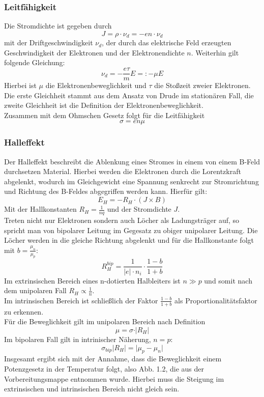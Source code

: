 \subsubsection{Leitfähigkeit}
Die Stromdichte ist gegeben durch 
$$J = \rho \cdot \nu _d = - e n \cdot \nu _d$$
mit der Driftgeschwindigkeit $\nu _d$, der durch das elektrische Feld erzeugten Geschwindigkeit der Elektronen und der Elektronendichte $n$. Weiterhin gilt folgende Gleichung:
$$\nu _d = - \frac{e \tau}{m} E =: -\mu E $$
Hierbei ist $\mu$ die Elektronenbeweglichkeit und $\tau$ die Stoßzeit zweier Elektronen. Die erste Gleichheit stammt aus dem Ansatz von Drude im stationären Fall, die zweite Gleichheit ist die Definition der Elektronenbeweglichkeit. \\
Zusammen mit dem Ohmschen Gesetz folgt für die Leitfähigkeit
$$\sigma = en\mu $$
\subsubsection{Halleffekt}
Der Halleffekt beschreibt die Ablenkung eines Stromes in einem von einem B-Feld durchsetzen Material. Hierbei werden die Elektronen durch die Lorentzkraft abgelenkt, wodurch im Gleichgewicht eine Spannung senkrecht zur Stromrichtung und Richtung des B-Feldes abgegriffen werden kann. Hierfür gilt:
$$E_H = -R_H \cdot (J \times B) $$
Mit der Hallkonstanten $R_H = \frac{1}{nq}$ und der Stromdichte $J$.\\
Treten nicht nur Elektronen sondern auch Löcher als Ladungsträger auf, so spricht man von bipolarer Leitung im Gegesatz zu obiger unipolarer Leitung. Die Löcher werden in die gleiche Richtung abgelenkt und für die Hallkonstante folgt mit $b = \frac{\mu _n}{\mu _p}$:
$$R_H^{bip} = \frac{1}{\vert e \vert \cdot n_i} \cdot \frac{1 - b}{1 + b}$$
Im extrinsischen Bereich eines n-dotierten Halbleiters ist $n \gg p$ und somit nach dem unipolaren Fall $R_H \propto \frac{1}{n}$. \\
Im intrinsischen Bereich ist schließlich der Faktor $\frac{1 - b}{1 + b}$ als Proportionalitätsfaktor zu erkennen.\\
\newline
Für die Beweglichkeit gilt im unipolaren Bereich nach Definition
$$\mu = \sigma \cdot \vert R_H \vert $$
Im bipolaren Fall gilt in intrinischer Näherung, $n = p$:
$$\sigma _{bip} \vert R_H \vert = \vert \mu_p - \mu_n \vert$$
Insgesamt ergibt sich mit der Annahme, dass die Beweglichkeit einem Potenzgesetz in der Temperatur folgt, also Abb. 1.2, die aus der Vorbereitungsmappe entnommen wurde. Hierbei muss die Steigung im extrinsischen und intrinsischen Bereich nicht gleich sein.
